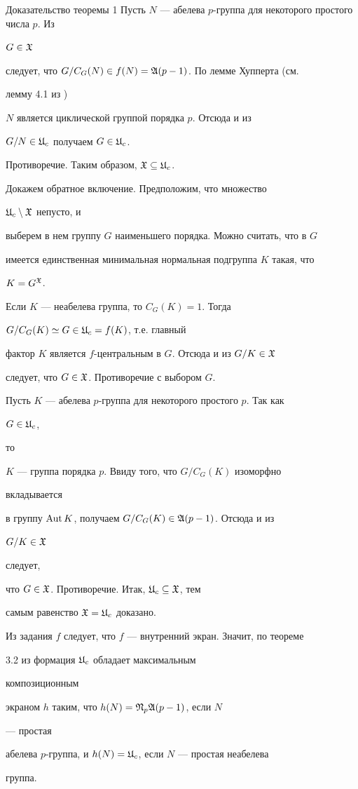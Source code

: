 \begin{pf*}{Доказательство теоремы 1}
Пусть $N$ --- абелева $p$-группа для некоторого простого числа $p$. Из


$G\in\frak X$


следует, что $G/C_G(N)\in f(N)=\frak A(p-1)$. По лемме Хупперта (см.


лемму 4.1 из \cite{She})


$N$ является циклической группой порядка $p$. Отсюда и из


$G/N\in\frak U_c$ получаем $G\in\frak U_c$.


Противоречие. Таким образом, $\frak X\subseteq\frak U_c$.





Докажем обратное включение. Предположим, что множество


$\frak U_c\setminus\frak X$ непусто, и


выберем в нем группу $G$ наименьшего порядка. Можно считать, что в $G$


имеется единственная минимальная нормальная подгруппа $K$ такая, что


$K=G^{\frak X}$.





Если $K$ --- неабелева группа, то $C_G(K)=1$. Тогда


$G/C_G(K)\simeq G\in\frak U_c=f(K)$, т.е. главный


фактор $K$ является $f$-центральным в $G$. Отсюда и из $G/K\in\frak X$


следует, что $G\in\frak X$. Противоречие с выбором $G$.





Пусть $K$ --- абелева $p$-группа для некоторого простого $p$. Так как


$G\in\frak U_c$,


то


$K$ --- группа порядка $p$. Ввиду того, что $G/C_G(K)$ изоморфно


вкладывается


в группу $\operatorname{Aut} K$, получаем $G/C_G(K)\in\frak A(p-1)$. Отсюда и из


$G/K\in\frak X$


следует,


что $G\in\frak X$. Противоречие. Итак, $\frak U_c\subseteq\frak X$, тем


самым равенство $\frak X=\frak U_c$ доказано.





Из задания $f$ следует, что $f$ --- внутренний экран. Значит, по теореме


3.2 из \cite{She} формация $\frak U_c$ обладает максимальным


композиционным


экраном $h$ таким, что $h(N)=\frak N_p\frak A(p-1)$, если $N$


--- простая


абелева $p$-группа, и $h(N)=\frak U_c$, если $N$ --- простая неабелева


группа.


\end{pf*}
